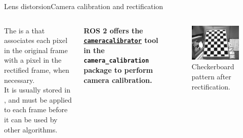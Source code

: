 \begin{frame}{Lens distorsion}{Camera calibration and rectification}
	\begin{columns}
		The  is a  that associates each pixel in the original frame with a pixel in the rectified frame,  when necessary.\\
    \bigskip
    It is usually stored in , and must be applied to each frame before it can be used by other algorithms.
    \vspace{.45cm}
    \begin{block}{}
      \centering
      \textbf{ROS 2 offers the \href{https://navigation.ros.org/tutorials/docs/camera_calibration.html}{\color{blue}\underline{\texttt{cameracalibrator}}} tool in the \texttt{camera\_calibration} package to perform camera calibration.}
    \end{block}

		\begin{figure}
			\centering
			\includegraphics[width=.9\textwidth]{calibrated}
			\caption{Checkerboard pattern after rectification.}
			\label{fig:calibrated}
		\end{figure}
	\end{columns}
\end{frame}
